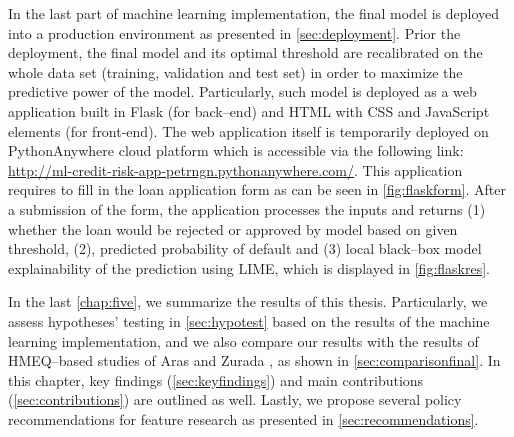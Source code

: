 In the last part of machine learning implementation, the final model is deployed into a production environment as presented in \autoref{sec:deployment}.
Prior the deployment, the final model and its optimal threshold are recalibrated on the whole data set (training, validation and test set) in order to maximize the predictive power of the model.
Particularly, such model is deployed as a web application built in Flask (for back--end) and HTML with CSS and JavaScript elements (for front-end).
The web application itself is temporarily deployed on PythonAnywhere cloud platform which is accessible via the following link: \url{http://ml-credit-risk-app-petrngn.pythonanywhere.com/}.
This application requires to fill in the loan application form  as can be seen in \autoref{fig:flaskform}.
After a submission of the form, the application processes the inputs and returns (1) whether the loan would be rejected or approved by model based on given threshold, (2), predicted probability of default and (3) local black--box model explainability of the prediction using LIME, which is displayed in \autoref{fig:flaskres}.


In the last \autoref{chap:five}, we summarize the results of this thesis. Particularly, we assess hypotheses' testing in \autoref{sec:hypotest} based on the results of the machine learning implementation, and we also compare our results with the results of HMEQ--based studies of Aras \citep{serkan2021bagging} and Zurada \citep{zurada2014classification}, as shown in \autoref{sec:comparisonfinal}.
In this chapter, key findings (\autoref{sec:keyfindings}) and main contributions (\autoref{sec:contributions}) are outlined as well.
Lastly, we propose several policy recommendations for feature research as presented in \autoref{sec:recommendations}.